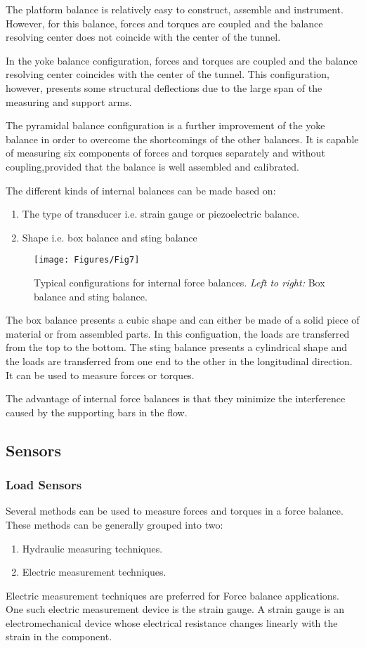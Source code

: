 The platform balance is relatively easy to construct, assemble and instrument. However, for this balance, forces and torques are coupled and the balance resolving center does not coincide with the center of the tunnel.
 
In the yoke balance configuration, forces and torques are coupled and the balance resolving center coincides with the center of the tunnel. This configuration, however, presents some structural deflections due to the large span of the measuring and support arms.

The pyramidal balance configuration is a further improvement of the yoke balance in order to overcome the shortcomings of the other balances. It is capable of measuring six components of forces and
torques separately and without coupling,provided that the balance is well assembled and calibrated.

The different kinds of internal balances can be made based on:
\begin{enumerate}
\item The type of transducer i.e. strain gauge or piezoelectric balance.
\item Shape i.e. box balance and sting balance
\end{enumerate} 
\begin{center}
	\begin{figure}[!h]
	\centering
	\texttt{[image: Figures/Fig7]}
	\caption{Typical configurations for internal force balances. \textit{Left to right:} Box balance and sting balance.}
	\end{figure}
\end{center}
The box balance presents a cubic shape and can either be made of a solid piece of material or from assembled parts. In this configuation, the loads are transferred from the top to the bottom. The sting balance presents a cylindrical shape and the loads are transferred from one end to the other in the longitudinal direction. It can be used to measure forces or torques.

The advantage of internal force balances is that they minimize the interference caused by the supporting bars in the flow.
\subsection{Sensors}
\subsubsection{Load Sensors}
Several methods can be used to measure forces and torques in a force balance. These methods can be generally grouped into two:
\begin{enumerate}
\item Hydraulic measuring techniques.
\item Electric measurement techniques.
\end{enumerate}
Electric measurement techniques are preferred for Force balance applications. One such electric measurement device is the strain gauge. A strain gauge is an electromechanical device whose electrical resistance changes linearly with the strain in the component.


